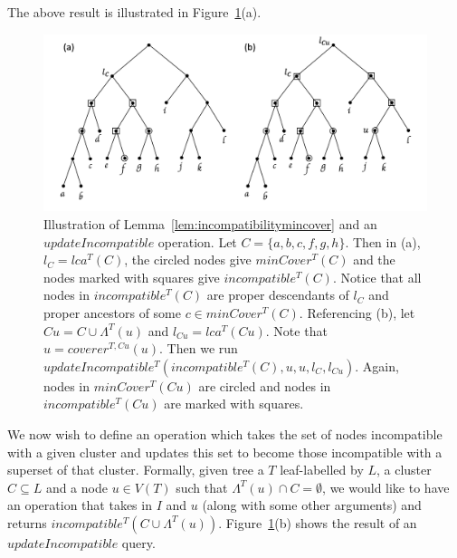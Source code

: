 \documentclass{article}
\newcommand{\leafset}{\Lambda}
\begin{document}
    The above result is illustrated in Figure~\ref{fig:incompatibility}(a).

    \begin{figure}[ht]
        \includegraphics[scale=0.5]{incompatibility}
        \centering
        \caption[Incompatibility and the $updateIncompatible$ operation]{Illustration of Lemma~\ref{lem:incompatibilitymincover} and an $updateIncompatible$ operation. Let $C = \{a, b, c, f, g, h\}$. Then in (a), $l_C = lca^T(C)$, the circled nodes give $minCover^{T}(C)$ and the nodes marked with squares give $incompatible^T(C)$. Notice that all nodes in $incompatible^T(C)$ are proper descendants of $l_C$ and proper ancestors of some $c \in minCover^{T}(C)$. Referencing (b), let $Cu = C \cup \leafset^{T}(u)$ and $l_{Cu} = lca^{T}(Cu)$. Note that $u = coverer^{T, Cu}(u)$. Then we run $updateIncompatible^{T}(incompatible^{T}(C), u, u, l_C, l_{Cu})$. Again, nodes in $minCover^{T}(Cu)$ are circled and nodes in $incompatible^{T}(Cu)$ are marked with squares.}
        \label{fig:incompatibility}
    \end{figure}

    We now wish to define an operation which takes the set of nodes incompatible with a given cluster and updates this set to become those incompatible with a superset of that cluster. Formally, given tree a $T$ leaf-labelled by $L$, a cluster $C \subseteq L$ and a node $u \in V(T)$ such that $\leafset^{T}(u) \cap C = \emptyset$, we would like to have an operation that takes in $I$ and $u$ (along with some other arguments) and returns $incompatible^{T}(C \cup \leafset^{T}(u))$. Figure~\ref{fig:incompatibility}(b) shows the result of an $updateIncompatible$ query.
\end{document}
